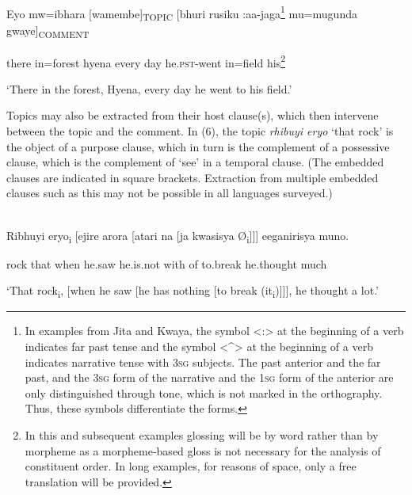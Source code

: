 \documentclass[output=paper]{langsci/langscibook}
\begin{document}
\ea\label{ex:}
\\
\gll Eyo mw=ibhara [wamembe]\textsubscript{TOPIC} [bhuri rusiku :aa-jaga\footnote{In examples from Jita and Kwaya, the symbol {\textless}:{\textgreater} at the beginning of a verb indicates far past tense and the symbol {\textless}\^{}{\textgreater} at the beginning of a verb indicates narrative tense with 3\textsc{sg} subjects. The past anterior and the far past, and the 3\textsc{sg} form of the narrative and the 1\textsc{sg} form of the anterior are only distinguished through tone, which is not marked in the orthography. Thus, these symbols differentiate the forms.}\textsuperscript{ }mu=mugunda gwaye]\textsubscript{COMMENT}\\
\begin{styleUntitledi}
there in=forest hyena every  day he.\textsc{pst}{}-went in=field his\footnote{In this and subsequent examples glossing will be by word rather than by morpheme as a morpheme-based gloss is not necessary for the analysis of constituent order. In long examples, for reasons of space, only a free translation will be provided.}
\end{styleUntitledi}

\glt \textup{‘}\textup{There in the forest, Hyena, every day he went to his field.’}
\z

Topics may also be extracted from their host clause(s), which then intervene between the topic and the comment. In (6), the topic \textit{rhibuyi eryo} ‘that rock’ is the object of a purpose clause, which in turn is the complement of a possessive clause, which is the complement of ‘see’ in a temporal clause. (The embedded clauses are indicated in square brackets. Extraction from multiple embedded clauses such as this may not be possible in all languages surveyed.)

\ea\label{ex:}
\\
\gll Ribhuyi eryo\textsubscript{i} [ejire arora [atari na [ja kwasisya Ø\textsubscript{i}]]] eeganirisya muno.\\
\begin{styleUntitledi}
rock that when he.saw he.is.not with of to.break he.thought much
\end{styleUntitledi}

\glt \textup{‘}\textup{That rock}\textsubscript{i}\textup{, [when he saw [he has nothing [to break (it}\textsubscript{i}\textup{)]]], he thought a}\textup{ lot.’}
\z
\end{document}
